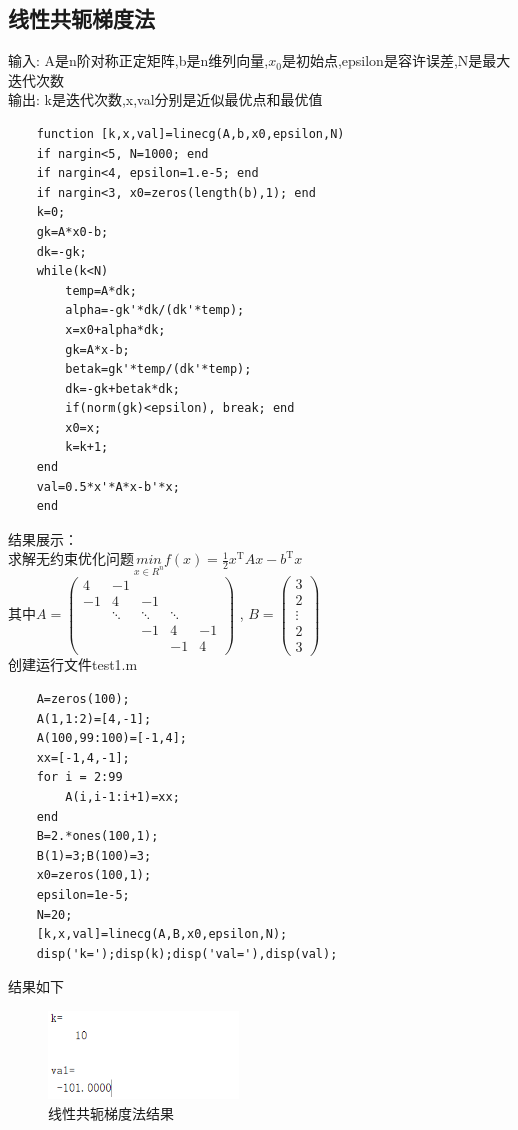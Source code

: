 \documentclass[12pt]{article} %
\begin{document}
	\subsection{线性共轭梯度法}
	输入: A是n阶对称正定矩阵,b是n维列向量,$x_0$是初始点,epsilon是容许误差,N是最大迭代次数\\
	\indent 输出: k是迭代次数,x,val分别是近似最优点和最优值
	\begin{lstlisting}
	function [k,x,val]=linecg(A,b,x0,epsilon,N)
	if nargin<5, N=1000; end
	if nargin<4, epsilon=1.e-5; end
	if nargin<3, x0=zeros(length(b),1); end
	k=0;
	gk=A*x0-b;
	dk=-gk;
	while(k<N)
		temp=A*dk;
		alpha=-gk'*dk/(dk'*temp);
		x=x0+alpha*dk;
		gk=A*x-b;
		betak=gk'*temp/(dk'*temp);
		dk=-gk+betak*dk;
		if(norm(gk)<epsilon), break; end
		x0=x;
		k=k+1;
	end
	val=0.5*x'*A*x-b'*x;
	end
	\end{lstlisting}
	\indent 结果展示：\\
	\indent 求解无约束优化问题$\underset{x\in R^n}{min} f(x)=\frac{1}{2}x^\mathrm{ T }Ax-b^\mathrm{ T }x$\\
	\indent 其中$A=\begin{pmatrix}
		4 & -1  \\
		-1 & 4 & -1 \\
		 & \ddots & \ddots & \ddots\\
		 & & -1 & 4 & -1\\
		& & & -1 & 4
		\end{pmatrix}$
	,
	$B=\begin{pmatrix}
		3 \\
		2 \\
		\vdots\\
		2\\
		3
	 \end{pmatrix}$\\
	\indent 创建运行文件test1.m
	\begin{lstlisting}
	A=zeros(100);
	A(1,1:2)=[4,-1];
	A(100,99:100)=[-1,4];
	xx=[-1,4,-1];
	for i = 2:99
		A(i,i-1:i+1)=xx;
	end
	B=2.*ones(100,1);
	B(1)=3;B(100)=3;
	x0=zeros(100,1);
	epsilon=1e-5;
	N=20;
	[k,x,val]=linecg(A,B,x0,epsilon,N);
	disp('k=');disp(k);disp('val='),disp(val);
	\end{lstlisting}
	\indent 结果如下
	\begin{figure}[ht]
		\centering
		\includegraphics[width=0.45\textwidth]{xxge.png}
		\caption{线性共轭梯度法结果}
		\label{fig:fig1}
	\end{figure}
\end{document}
